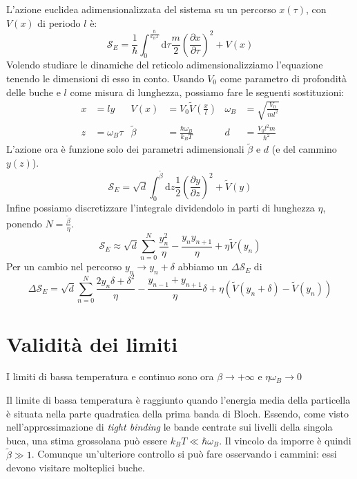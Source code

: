 \documentclass[italian]{article}
\newcommand{\action}{\mathcal{S}}
\newcommand{\deriv}[2]{\frac{\partial #1}{\partial #2}}
\newcommand{\diff}{\mathrm{d}}
\begin{document}
    L'azione euclidea adimensionalizzata del sistema su un percorso $x(\tau)$, con $V(x)$ di periodo $l$ è:
    \begin{equation}
        \action_E = \frac{1}{\hbar} \int_0^{\frac{\hbar}{k_B T}} \diff\tau \frac{m}{2}\left(\deriv{x}{\tau}\right)^2 + V(x)
    \end{equation}
    Volendo studiare le dinamiche del reticolo adimensionalizziamo l'equazione tenendo le dimensioni di esso in conto. Usando $V_0$ come parametro di profondità delle buche e $l$ come misura di lunghezza, possiamo fare le seguenti sostituzioni:
    \begin{align*}\label{eq:adimensional_subs}
        x &= ly  & V(x)&=V_0 \tilde{V}\left(\frac{x}{l}\right)  & \omega_B &= \sqrt{\frac{V_0}{m l^2}} \\
        z &= \omega_B \tau & \tilde{\beta} &= \frac{\hbar \omega_B}{k_B T} & d &
        = \frac{V_0 l^2 m}{\hbar^2}
    \end{align*}
    L'azione ora è funzione solo dei parametri adimensionali $\tilde{\beta}$ e $d$ (e del cammino $y(z)$).
    \begin{equation}
        \action_E = \sqrt{d} \int_0^{\tilde{\beta}} \diff z \frac{1}{2} \left(\deriv{y}{z}\right)^2 + \tilde{V}\left(y\right)
    \end{equation}
    Infine possiamo discretizzare l'integrale dividendolo in parti di lunghezza $\eta$, ponendo $N = \frac{\tilde{\beta}}{\eta}$.
    \begin{equation}
        \action_E \approx \sqrt{d} \sum_{n=0}^N \frac{y_n^2}{\eta} - \frac{y_n y_{n+1}}{\eta} + \eta \tilde{V} \left(y_n\right) 
    \end{equation}
    Per un cambio nel percorso $y_n \to y_n + \delta$ abbiamo un $\Delta\action_E$ di
    \begin{equation}
        \Delta\action_E = \sqrt{d} \sum_{n=0}^N \frac{2y_n\delta + \delta^2}{\eta}  - \frac{y_{n-1} + y_{n+1}}{\eta}\delta + \eta \left( \tilde{V} \left(y_n + \delta\right) - \tilde{V} \left(y_n\right) \right)
    \end{equation}
    
    
\section{Validità dei limiti}

    I limiti di bassa temperatura e continuo sono ora $\beta \to +\infty$ e $\eta \omega_B \to 0$
    
    Il limite di bassa temperatura è raggiunto quando l'energia media della particella è situata nella parte quadratica della prima banda di Bloch. Essendo, come visto nell'approssimazione di \textit{tight binding} le bande centrate sui livelli della singola buca, una stima grossolana può essere $k_B T \ll \hbar \omega_B$. Il vincolo da imporre è quindi $\tilde{\beta} \gg 1$. Comunque un'ulteriore controllo si può fare osservando i cammini: essi devono visitare molteplici buche.
    
\end{document}
